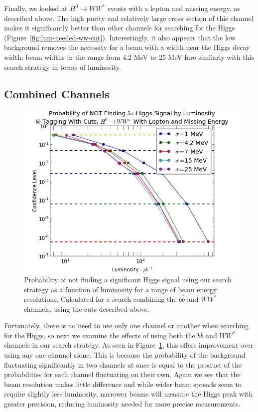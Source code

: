 \documentclass[a4paper]{article}
\begin{document}
	Finally, we looked at $H^0 \rightarrow WW^*$ events with a lepton and missing energy, as described above. The high purity and relatively large cross section of this channel makes it significantly better than other channels for searching for the Higgs (Figure~\ref{fig:lum-needed-ww-cut}). Interestingly, it also appears that the low background removes the necessity for a beam with a width near the Higgs decay width; beam widths in the range from 4.2 MeV to 25 MeV fare similarly with this search strategy in terms of luminosity.

	\subsection{Combined Channels}

	\begin{figure}
		\includegraphics[width=\textwidth]{lum-needed-ww-bb}
		\caption{Probability of not finding a significant Higgs signal using our search strategy as a function of luminosity for a range of beam energy resolutions. Calculated for a search combining the $b\bar{b}$ and $WW^*$ channels, using the cuts described above.\label{fig:lum-needed-ww-bb}}
	\end{figure}

	Fortunately, there is no need to use only one channel or another when searching for the Higgs, so next we examine the effects of using both the $b\bar{b}$ and $WW^*$ channels in our search strategy. As seen in Figure~\ref{fig:lum-needed-ww-bb}, this offers improvement over using any one channel alone. This is because the probability of the background fluctuating significantly in two channels at once is equal to the product of the probabilities for each channel fluctuating on their own. Again we see that the beam resolution makes little difference and while wider beam spreads seem to require slightly less luminosity, narrower beams will measure the Higgs peak with greater precision, reducing luminosity needed for more precise measurements. 
\end{document}
